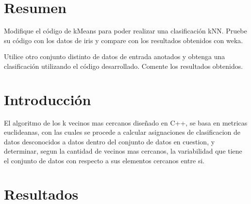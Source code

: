 \documentclass[12pt,letterpaper]{article}
\begin{document}
\begin{titlepage}






 

\vfill %

\end{titlepage}

\newpage

\section*{Resumen}

Modifique el código de kMeans para poder realizar una clasificación kNN. Pruebe su código con los datos de iris y compare con los resultados obtenidos con weka.

Utilice otro conjunto distinto de datos de entrada anotados y obtenga una clasificación utilizando el código desarrollado. Comente los resultados obtenidos.

\section{Introducción}

El algoritmo de los k vecinos mas cercanos diseñado en C++, se basa en metricas euclideanas, con las cuales se procede a calcular asignaciones de clasificacion de datos desconocidos a datos dentro del conjunto de datos en cuestion, y determinar, segun la cantidad de vecinos mas cercanos, la variabilidad que tiene el conjunto de datos con respecto a sus elementos cercanos entre si.


\section{Resultados}
\end{document}
